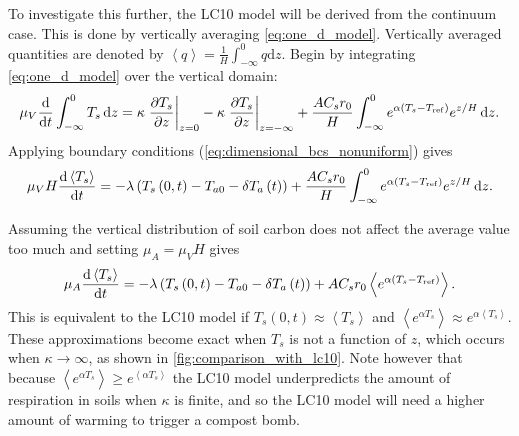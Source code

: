 To investigate this further, the LC10 model will be derived from the continuum case. This is done by vertically averaging \cref{eq:one_d_model}.
Vertically averaged quantities are denoted by
$\left\langle q \right\rangle = \frac{1}{H}\int_{-\infty}^0 q \mathrm{d}z$.  Begin by integrating \cref{eq:one_d_model} over the vertical domain:
\begin{equation}
  \label{eq:vertical_integration}
  \mu_V \dv{t} \int_{-\infty}^0 T_s \, \mathrm{d} z =
  \kappa \eval{\pdv{T_s}{z}}_{z=0}
  - \kappa \eval{\pdv{T_s}{z}}_{z=-\infty} +
  \frac{AC_sr_0}{H} \int_{-\infty}^0 e^{\alpha \left(T_s - T_{\mathrm{ref}}\right)} e^{z/H} \, \mathrm{d} z.
\end{equation}
Applying boundary conditions (\cref{eq:dimensional_bcs_nonuniform}) gives
\begin{equation}
  \label{eq:vertical_integration_after_bc}
  \mu_V H \dv{\left\langle T_s \right\rangle}{t} = -\lambda \left( T_s\left(0,t\right) - T_{a0}
    - \delta T_a\left(t\right)\right) + \frac{AC_sr_0}{H}\int_{-\infty}^0 e^{\alpha \left(T_s - T_{\mathrm{ref}}\right)} e^{z/H} \, \mathrm{d} z.
\end{equation}

Assuming the vertical distribution of soil carbon does not affect the average value too much and setting $\mu_A = \mu_VH$ gives 
\begin{equation}
  \label{eq:vertically_averaged}
  \mu_A \dv{\left\langle T_s \right\rangle}{t} = -\lambda \left( T_s\left(0,t\right) - T_{a0} - \delta T_a\left(t\right)\right) +
  AC_sr_0\left\langle e^{\alpha \left(T_s - T_{\mathrm{ref}}\right)}\right\rangle.
\end{equation}
This is equivalent to the LC10 model if $T_s(0,t) \approx \left\langle T_s \right\rangle$ and $\left\langle e^{\alpha T_s}\right\rangle \approx e^{\alpha \left\langle T_s \right\rangle}$.
These approximations become exact when $T_s$ is not a function of $z$, which occurs when $\kappa \rightarrow \infty$, as shown in \cref{fig:comparison_with_lc10}.
Note however that because $\left\langle e^{\alpha T_s} \right\rangle \ge e^{\left\langle \alpha T_s \right\rangle}$ the LC10 model underpredicts the amount of respiration
in soils when $\kappa$ is finite, and so the LC10 model will need a higher amount of warming to trigger a compost bomb.

  
